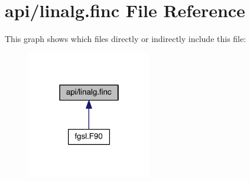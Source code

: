 \hypertarget{linalg_8finc}{\section{api/linalg.finc File Reference}
\label{linalg_8finc}
}
This graph shows which files directly or indirectly include this file\-:\nopagebreak
\begin{figure}[H]
\begin{center}
\leavevmode
\includegraphics[width=154pt]{linalg_8finc__dep__incl}
\end{center}
\end{figure}
